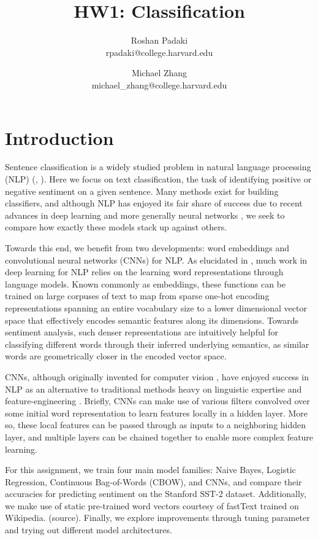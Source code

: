 \documentclass[11pt]{article}
\title{HW1: Classification}
\author{Roshan Padaki \\ rpadaki@college.harvard.edu \and Michael Zhang \\ michael\_zhang@college.harvard.edu }
\begin{document}
\maketitle{}
\section{Introduction}

Sentence classification is a widely studied problem in natural language processing (NLP) (\cite{wang2012baselines}, \cite{berger1996maximum}). Here we focus on text classification, the task of identifying positive or negative sentiment on a given sentence. Many methods exist for building classifiers, and although NLP has enjoyed its fair share of success due to recent advances in deep learning and more generally neural networks \citep{collobert2011natural}, we seek to compare how exactly these models stack up against others.

Towards this end, we benefit from two developments: word embeddings and convolutional neural networks (CNNs) for NLP. As elucidated in \citet{DBLP:journals/corr/Kim14f}, much work in deep learning for NLP relies on the learning word representations through language models. Known commonly as embeddings, these functions can be trained on large corpuses of text to map from sparse one-hot encoding representations spanning an entire vocabulary size to a lower dimensional vector space that effectively encodes semantic features along its dimensions. Towards sentiment analysis, such denser representations are intuitively helpful for classifying different words through their inferred underlying semantics, as similar words are geometrically closer in the encoded vector space.

CNNs, although originally invented for computer vision \citep{Lecun98gradient-basedlearning}, have enjoyed success in NLP as an alternative to traditional methods heavy on linguistic expertise and feature-engineering \citep{collobert2011natural}. Briefly, CNNs can make use of various filters convolved over some initial word representation to learn features locally in a hidden layer. More so, these local features can be passed through as inputs to a neighboring hidden layer, and multiple layers can be chained together to enable more complex feature learning.

For this assignment, we train four main model families: Naive Bayes, Logistic Regression, Continuous Bag-of-Words (CBOW), and CNNs, and compare their accuracies for predicting sentiment on the Stanford SST-2 dataset. Additionally, we make use of static pre-trained word vectors courtesy of fastText trained on Wikipedia. (source). Finally, we explore improvements through tuning parameter and trying out different model architectures. 
\end{document}
